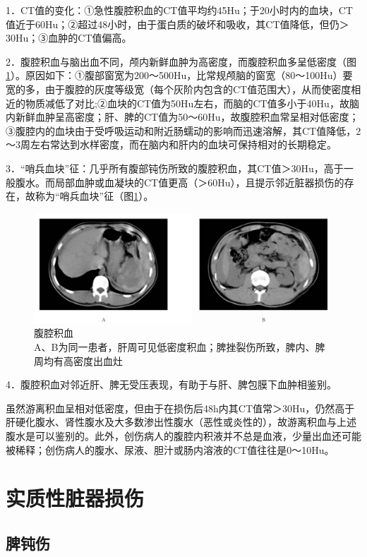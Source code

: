 1．CT值的变化：①急性腹腔积血的CT值平均约45Hu；于20小时内的血块，CT值近于60Hu；②超过48小时，由于蛋白质的破坏和吸收，其CT值降低，但仍＞30Hu；③血肿的CT值偏高。

2．腹腔积血与脑出血不同，颅内新鲜血肿为高密度，而腹腔积血多呈低密度（图\ref{fig20-1}）。原因如下：①腹部窗宽为200～500Hu，比常规颅脑的窗宽（80～100Hu）要宽的多，由于腹腔的灰度等级宽（每个灰阶内包含的CT值范围大），从而使密度相近的物质减低了对比;②血块的CT值为50Hu左右，而脑的CT值多小于40Hu，故脑内新鲜血肿呈高密度；肝、脾的CT值为50～60Hu，故腹腔积血常呈相对低密度；③腹腔内的血块由于受呼吸运动和附近肠蠕动的影响而迅速溶解，其CT值降低，2～3周左右常达到水样密度，而在脑内和肝内的血块可保持相对的长期稳定。

3．“哨兵血块”征：几乎所有腹部钝伤所致的腹腔积血，其CT值＞30Hu，高于一般腹水。而局部血肿或血凝块的CT值更高（＞60Hu），且提示邻近脏器损伤的存在，故称为“哨兵血块”征（图\ref{fig20-1}）。

\begin{figure}[!htbp]
 \centering
 \includegraphics[width=.7\textwidth,height=\textheight,keepaspectratio]{./images/Image00389.jpg}
 \captionsetup{justification=centering}
 \caption{腹腔积血\\{\small A、B为同一患者，肝周可见低密度积血；脾挫裂伤所致，脾内、脾周均有高密度出血灶}}
 \label{fig20-1}
  \end{figure} 

4．腹腔积血对邻近肝、脾无受压表现，有助于与肝、脾包膜下血肿相鉴别。

虽然游离积血呈相对低密度，但由于在损伤后48h内其CT值常＞30Hu，仍然高于肝硬化腹水、肾性腹水及大多数渗出性腹水（恶性或炎性的），故游离积血与上述腹水是可以鉴别的。此外，创伤病人的腹腔内积液并不总是血液，少量出血还可能被稀释；创伤病人的腹水、尿液、胆汁或肠内溶液的CT值往往是0～10Hu。

\section{实质性脏器损伤}

\subsection{脾钝伤}

